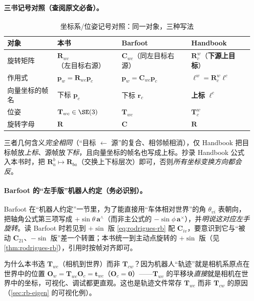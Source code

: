 \paragraph{三书记号对照（查阅原文必备）。}
\begin{table}[H]\centering\small
\caption{坐标系/位姿记号对照：同一对象，三种写法}
\label{tab:rb-frame-notation}
\begin{tabular}{llll}
\toprule
对象 & 本书 & Barfoot\cite{barfoot2024state} & Handbook\cite{carlone2026handbook} \\
\midrule
旋转矩阵 & $\mathbf{R}_{wc}$（左目标右源）& $\mathbf{C}_{wc}$（同左目标右源）& $\mathbf{R}_c^{w}$（\textbf{下源上目标}）\\
作用式 & $\mathbf{p}_w=\mathbf{R}_{wc}\mathbf{p}_c$ & $\mathbf{p}_w=\mathbf{C}_{wc}\mathbf{p}_c$ & $\boldsymbol{\ell}^w=\mathbf{R}_c^{w}\boldsymbol{\ell}^c$ \\
向量坐标的帧名 & 下标 $\mathbf{p}_c$ & 下标 $\mathbf{r}_c$ & \textbf{上标} $\boldsymbol{\ell}^c$ \\
位姿 & $\mathbf{T}_{wc}\in\SE(3)$ & $\mathbf{T}_{wc}$ & $\mathbf{T}_c^{w}$ \\
旋转字母 & $\mathbf{R}$ & $\mathbf{C}$ & $\mathbf{R}$ \\
\bottomrule
\end{tabular}
\end{table}

\noindent 三者几何含义\emph{完全相同}（“目标 $\leftarrow$ 源”的复合、相邻帧相消），仅 Handbook 把目标帧放\emph{上标}、源帧放\emph{下标}，且向量坐标的帧名也写成上标。抄录 Handbook 公式入本书时，把 $\mathbf{R}_a^b\mapsto\mathbf{R}_{ba}$（交换上下标层次）即可，否则\emph{所有坐标变换方向都会反}。

\paragraph{Barfoot 的“左手版”机器人约定（务必识别）。}Barfoot 在“机器人约定”一节里，为了能直接用“车体相对世界”的角 $\theta_{vi}$ 表朝向，把轴角公式第三项写成 $+\sin\theta\,\mathbf{a}^\wedge$（而非主公式的 $-\sin\phi\,\mathbf{a}^\times$），并\emph{明说这对应左手旋转}\cite{barfoot2024state}。读 Barfoot 时若见到 $+\sin$ 版 \cref{eq:rodrigues-rb} 配 $\mathbf{C}_{iv}$，要意识到它与“被动 $\mathbf{C}_{21}$、$-\sin$ 版”差一个转置；本书统一到主动点旋转的 $+\sin$ 版（见 \cref{thm:rodrigues-rb}），引用时按帧对齐即可。

\begin{insight}
为什么本书选 $\mathbf{T}_{wc}$（相机到世界）而非 $\mathbf{T}_{cw}$？因为机器人“轨迹”就是相机系原点在世界中的位置 $\mathbf{O}_w=\mathbf{T}_{wc}\mathbf{O}_c=\mathbf{t}_{wc}$（$\mathbf{O}_c=\mathbf{0}$）——$\mathbf{T}_{wc}$ 的平移块\emph{直接}就是相机在世界中的坐标，可视化、调试都更直观\cite{gaoxiang2019slam14}。这也是轨迹文件常存 $\mathbf{T}_{wc}$ 而非 $\mathbf{T}_{cw}$ 的原因（\cref{sec:rb-eigen} 的可视化例）。
\end{insight}

